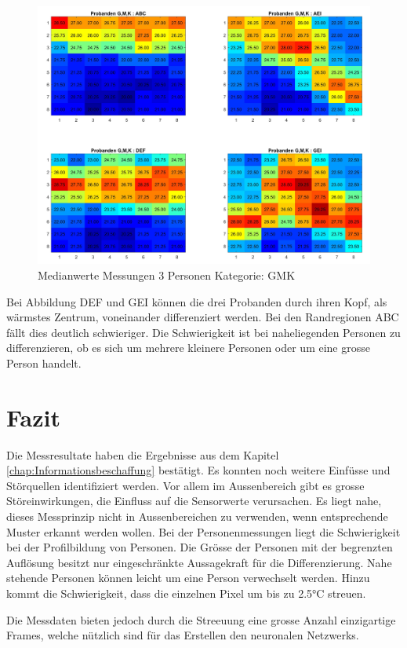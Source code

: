 \begin{figure}[H]
	\centering
	\includegraphics[width=0.8\linewidth]{fig/p3_kkg_4x4.jpg}
	\caption[Medianwerte Messungen 3 Personen Kategorie: GMK]{Medianwerte Messungen 3 Personen Kategorie: GMK}
	\label{fig:p33x3allpositons}
\end{figure}


Bei Abbildung DEF und GEI können die drei Probanden durch ihren Kopf, als wärmstes Zentrum, voneinander differenziert werden. Bei den Randregionen ABC fällt dies deutlich schwieriger. Die Schwierigkeit ist bei naheliegenden Personen zu differenzieren, ob es sich um mehrere kleinere Personen oder um eine grosse Person handelt.


\section{Fazit}
Die Messresultate haben die Ergebnisse aus dem Kapitel \ref{chap:Informationsbeschaffung} bestätigt. Es konnten noch weitere Einfüsse und Störquellen identifiziert werden. Vor allem im Aussenbereich gibt es grosse Störeinwirkungen, die Einfluss auf die Sensorwerte verursachen. Es liegt nahe, dieses Messprinzip nicht in Aussenbereichen zu verwenden, wenn entsprechende Muster erkannt werden wollen.
Bei der Personenmessungen liegt die Schwierigkeit bei der Profilbildung von Personen. Die Grösse der Personen mit der begrenzten Auflösung besitzt nur eingeschränkte Aussagekraft für die Differenzierung. Nahe stehende Personen können leicht um eine Person verwechselt werden. Hinzu kommt die Schwierigkeit, dass die einzelnen Pixel um bis zu 2.5°C streuen. 

Die Messdaten bieten jedoch durch die Streeuung eine grosse Anzahl einzigartige Frames, welche nützlich sind für das Erstellen den neuronalen Netzwerks.

